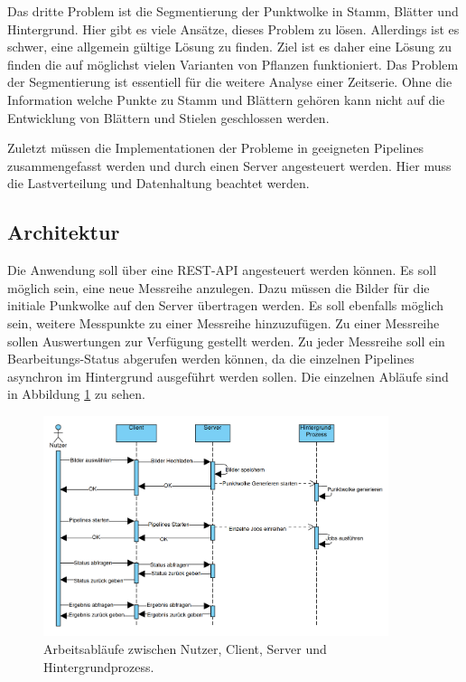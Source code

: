 \documentclass[12pt,titlepage, twoside]{article}
\begin{document}
Das dritte Problem ist die Segmentierung der Punktwolke in Stamm, Blätter und Hintergrund. Hier gibt es viele Ansätze, dieses Problem zu lösen. Allerdings ist es schwer, eine allgemein gültige Lösung zu finden. 
Ziel ist es daher eine Lösung zu finden die auf möglichst vielen Varianten von Pflanzen funktioniert. 
Das Problem der Segmentierung ist essentiell für die weitere Analyse einer Zeitserie. Ohne die Information welche Punkte zu Stamm und Blättern gehören kann nicht auf die Entwicklung von Blättern und Stielen geschlossen werden.

Zuletzt müssen die Implementationen der Probleme in geeigneten Pipelines zusammengefasst werden und durch einen Server angesteuert werden. Hier muss die Lastverteilung und Datenhaltung beachtet werden.

\subsection{Architektur}
\label{sec:realisierung:architektur}

Die Anwendung soll über eine REST-API angesteuert werden können. Es soll möglich sein, eine neue Messreihe anzulegen. Dazu müssen die Bilder für die initiale Punkwolke auf den Server übertragen werden. 
Es soll ebenfalls möglich sein, weitere Messpunkte zu einer Messreihe hinzuzufügen. Zu einer Messreihe sollen Auswertungen zur Verfügung gestellt werden. 
Zu jeder Messreihe soll ein Bearbeitungs-Status abgerufen werden können, da die einzelnen Pipelines asynchron im Hintergrund ausgeführt werden sollen.
Die einzelnen Abläufe sind in Abbildung \ref{fig:WorkflowClientServer} zu sehen.

\begin{figure}
    \centering
    \includegraphics[width=0.9\textwidth]{./Images/WorkflowClientServer.png}
    \caption{Arbeitsabläufe zwischen Nutzer, Client, Server und Hintergrundprozess.}
    \label{fig:WorkflowClientServer}
\end{figure}
\end{document}
